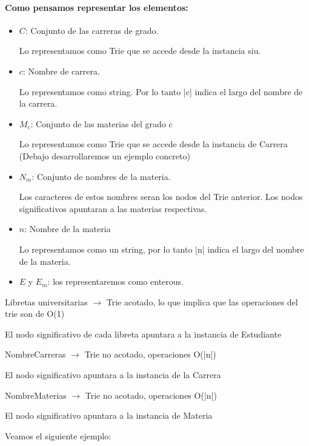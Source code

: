 \documentclass[a4paper,10pt]{article}
\begin{document}
\paragraph*{Como pensamos representar los elementos:}

\begin{itemize}
    \item $C$: Conjunto de las carreras de grado.


          Lo representamos como Trie que se accede desde la instancia siu.
    \item $c$: Nombre de carrera.


          Lo representamos como string. Por lo tanto |c| indica el largo del nombre de la carrera.
    \item $M_c$: Conjunto de las materias del grado c

          Lo representamos como Trie que se accede desde la instancia de Carrera (Debajo desarrollaremos un ejemplo concreto)
    \item $N_m$: Conjunto de nombres de la materia.

          Los caracteres de estos nombres seran los nodos del Trie anterior. Los nodos significativos apuntaran a las materias respectivas.
    \item $n$: Nombre de la materia

          Lo representamos como un string, por lo tanto |n| indica el largo del nombre de la materia.
    \item $E$ y $E_m$: los representaremos como enterous.
\end{itemize}
\salto{\baselineskip}
Libretas universitarias $\rightarrow$ Trie acotado, lo que implica que las operaciones del trie son de O(1)

{\small El nodo significativo de cada libreta apuntara a la instancia de Estudiante}

\salto{\baselineskip}

NombreCarreras $\rightarrow$ Trie no acotado, operaciones O(|n|)

{\small El nodo significativo apuntara a la instancia de la Carrera}

\salto{\baselineskip}

NombreMaterias $\rightarrow$ Trie no acotado, operaciones O(|n|)

{\small El nodo significativo apuntara a la instancia de Materia}

\salto{\baselineskip}

Veamos el siguiente ejemplo:
\salto{\baselineskip}
\end{document}
